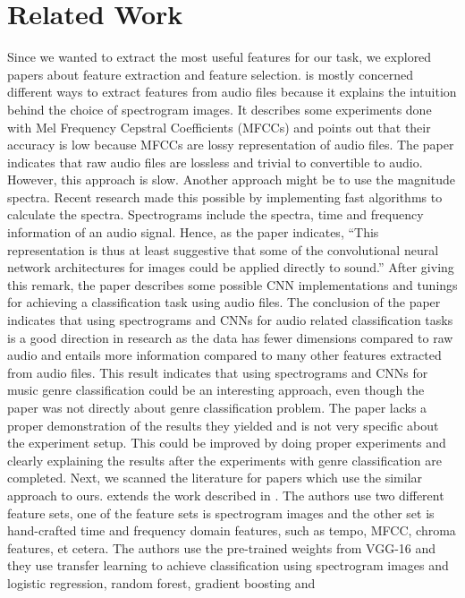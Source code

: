 \documentclass[acmtog, authorversion]{acmart}
\begin{document}
\section{Related Work}
Since we wanted to extract the most useful features for our task, we explored papers about feature extraction and feature selection. \cite{wyse2017audio} 
is mostly concerned different ways to extract features from audio files because it explains the intuition behind the choice of spectrogram images. 
It describes some experiments done with Mel Frequency Cepstral Coefficients (MFCCs) and points out that their accuracy is low because MFCCs are lossy 
representation of audio files. The paper indicates that raw audio files are lossless and trivial to convertible to audio. However, this approach is slow. 
Another approach might be to use the magnitude spectra. Recent research made this possible by implementing fast algorithms to calculate the spectra. 
Spectrograms include the spectra, time and frequency information of an audio signal. Hence, as the paper indicates, “This representation is thus at least 
suggestive that some of the convolutional neural network architectures for images could be applied directly to sound.” After giving this remark, the paper 
describes some possible CNN implementations and tunings for achieving a classification task using audio files. The conclusion of the paper indicates that 
using spectrograms and CNNs for audio related classification tasks is a good direction in research as the data has fewer dimensions compared to raw audio 
and entails more information compared to many other features extracted from audio files. This result indicates that using spectrograms and CNNs for music 
genre classification could be an interesting approach, even though the paper was not directly about genre classification problem. The paper lacks a proper 
demonstration of the results they yielded and is not very specific about the experiment setup. This could be improved by doing proper experiments and 
clearly explaining the results after the experiments with genre classification are completed.
Next, we scanned the literature for papers which use the similar approach to ours. \cite{bahuleyan2018music} extends 
the work described in \cite{wyse2017audio}. The authors use two different feature sets, 
one of the feature sets is spectrogram images and the other set is hand-crafted time and frequency domain features, such as tempo, MFCC, chroma features, 
et cetera. The authors use the pre-trained weights from VGG-16 \cite{simonyan2014very} and they use transfer learning to achieve classification using spectrogram images and logistic regression, random forest, gradient boosting and 
\end{document}
